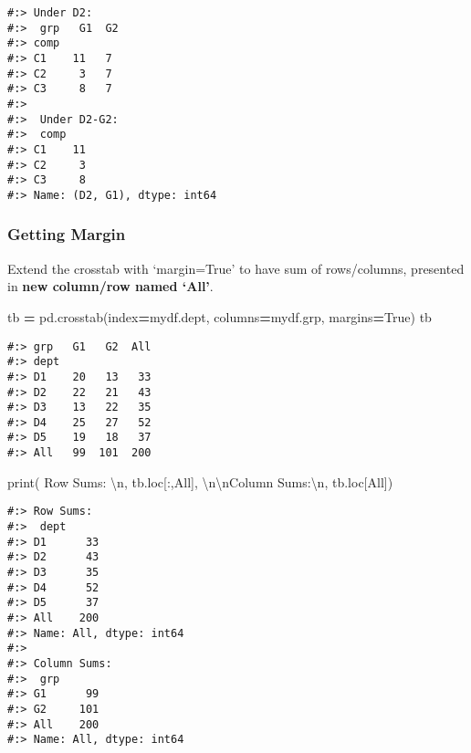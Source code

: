\documentclass[
]{book}
\newenvironment{Shaded}{\begin{snugshade}}{\end{snugshade}}
\newcommand{\BuiltInTok}[1]{#1}
\newcommand{\CharTok}[1]{\textcolor[rgb]{0.5,0.5,0.5}{#1}}
\newcommand{\NormalTok}[1]{#1}
\newcommand{\OperatorTok}[1]{\textcolor[rgb]{0.43,0.43,0.43}{\textbf{#1}}}
\newcommand{\StringTok}[1]{\textcolor[rgb]{0.5,0.5,0.5}{#1}}
\newcommand{\VariableTok}[1]{\textcolor[rgb]{0,0,0}{#1}}
\begin{document}
\begin{verbatim}
#:> Under D2:
#:>  grp   G1  G2
#:> comp        
#:> C1    11   7
#:> C2     3   7
#:> C3     8   7 
#:> 
#:>  Under D2-G2:
#:>  comp
#:> C1    11
#:> C2     3
#:> C3     8
#:> Name: (D2, G1), dtype: int64
\end{verbatim}

\hypertarget{getting-margin}{%
\subsubsection{Getting Margin}\label{getting-margin}}

Extend the crosstab with `margin=True' to have sum of rows/columns, presented in \textbf{new column/row named `All'}.

\begin{Shaded}
\begin{Highlighting}[]
\NormalTok{tb }\OperatorTok{=}\NormalTok{ pd.crosstab(index}\OperatorTok{=}\NormalTok{mydf.dept, columns}\OperatorTok{=}\NormalTok{mydf.grp, margins}\OperatorTok{=}\VariableTok{True}\NormalTok{)}
\NormalTok{tb}
\end{Highlighting}
\end{Shaded}

\begin{verbatim}
#:> grp   G1   G2  All
#:> dept              
#:> D1    20   13   33
#:> D2    22   21   43
#:> D3    13   22   35
#:> D4    25   27   52
#:> D5    19   18   37
#:> All   99  101  200
\end{verbatim}

\begin{Shaded}
\begin{Highlighting}[]
\BuiltInTok{print}\NormalTok{(}
  \StringTok{\textquotesingle{}Row Sums:     }\CharTok{\textbackslash{}n}\StringTok{\textquotesingle{}}\NormalTok{, tb.loc[:,}\StringTok{\textquotesingle{}All\textquotesingle{}}\NormalTok{],}
  \StringTok{\textquotesingle{}}\CharTok{\textbackslash{}n\textbackslash{}n}\StringTok{Column Sums:}\CharTok{\textbackslash{}n}\StringTok{\textquotesingle{}}\NormalTok{, tb.loc[}\StringTok{\textquotesingle{}All\textquotesingle{}}\NormalTok{])}
\end{Highlighting}
\end{Shaded}

\begin{verbatim}
#:> Row Sums:     
#:>  dept
#:> D1      33
#:> D2      43
#:> D3      35
#:> D4      52
#:> D5      37
#:> All    200
#:> Name: All, dtype: int64 
#:> 
#:> Column Sums:
#:>  grp
#:> G1      99
#:> G2     101
#:> All    200
#:> Name: All, dtype: int64
\end{verbatim}
\end{document}
